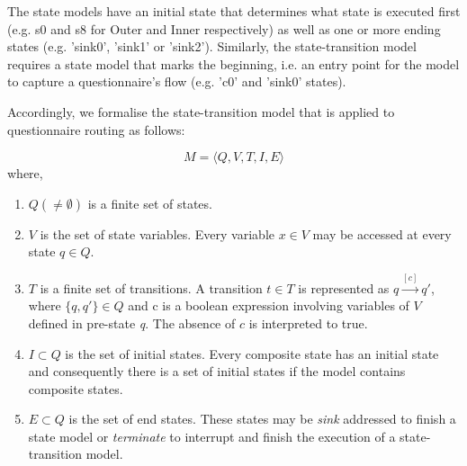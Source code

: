 	The state models have an initial state that determines what state is executed first (e.g. s0 and s8 for Outer and Inner respectively) as well as one or more ending states (e.g. 'sink0', 'sink1' or 'sink2'). Similarly, the state-transition model requires a state model that marks the beginning, i.e. an entry point for the model to capture a questionnaire's flow (e.g. 'c0' and 'sink0' states).


	Accordingly, we formalise the state-transition model that is applied to questionnaire routing as follows:

	\begin{equation}\label{design:eqn:stateTransition}
		M = \langle Q,V,T,I,E \rangle
	\end{equation}
	where,
	\begin{enumerate}
		\item $Q(\neq \emptyset)$ is a finite set of states.
		\item $V$ is the set of state variables. Every variable $x \in V$ may be accessed at every state $q \in Q$.
		\item $T$ is a finite set of transitions. A transition $t \in T$ is represented as $q \xrightarrow{[c]} 
		q'$, where $\{q,q'\} \in Q$ and c is a boolean expression involving variables of $V$ defined in pre-state \emph{q}. The absence of $c$ is interpreted to true.
		\item $I\subset Q$ is the set of initial states. Every composite state has an initial state and consequently there is a set of initial states if the model contains composite states.
		\item $E\subset Q$ is the set of end states. These states may be \emph{sink} addressed to finish a state model or \emph{terminate} to interrupt and finish the execution of a state-transition model.
	\end{enumerate}

